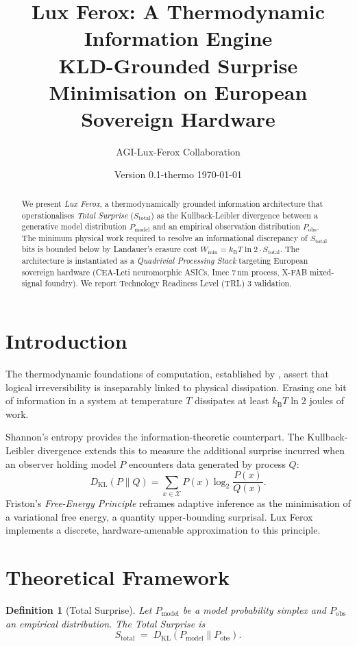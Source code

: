 \documentclass[11pt,a4paper,twocolumn]{article}
\title{%
  \textbf{Lux Ferox: A Thermodynamic Information Engine}\\[4pt]
  \large KLD-Grounded Surprise Minimisation on European Sovereign Hardware
}
\author{AGI-Lux-Ferox Collaboration}
\date{Version 0.1-thermo \quad \today}
\newtheorem{definition}{Definition}
\newcommand{\DKL}{D_{\mathrm{KL}}}
\newcommand{\kB}{k_{\mathrm{B}}}
\newcommand{\Stot}{S_{\mathrm{total}}}
\newcommand{\Wmin}{W_{\min}}
\begin{document}
\maketitle

\begin{abstract}
We present \textit{Lux Ferox}, a thermodynamically grounded information
architecture that operationalises \emph{Total Surprise} ($\Stot$) as the
Kullback-Leibler divergence between a generative model distribution
$P_{\text{model}}$ and an empirical observation distribution
$P_{\text{obs}}$.
The minimum physical work required to resolve an informational discrepancy
of $\Stot$ bits is bounded below by Landauer's erasure cost
$\Wmin = \kB T \ln 2 \cdot \Stot$.
The architecture is instantiated as a \emph{Quadrivial Processing Stack}
targeting European sovereign hardware (CEA-Leti neuromorphic ASICs,
Imec 7\,nm process, X-FAB mixed-signal foundry).
We report Technology Readiness Level (TRL) 3 validation.
\end{abstract}

\section{Introduction}
The thermodynamic foundations of computation, established by
\citet{landauer1961}, assert that logical irreversibility is inseparably
linked to physical dissipation. Erasing one bit of information in a system
at temperature $T$ dissipates at least $\kB T \ln 2$ joules of work.

Shannon's entropy \citep{shannon1948} provides the information-theoretic
counterpart. The Kullback-Leibler divergence \citep{kullback1951} extends
this to measure the additional surprise incurred when an observer holding
model $P$ encounters data generated by process $Q$:
\begin{equation}
  \DKL(P \| Q) = \sum_{x \in \mathcal{X}} P(x) \log_2 \frac{P(x)}{Q(x)}.
  \label{eq:kld}
\end{equation}
Friston's \emph{Free-Energy Principle} \citep{friston2010} reframes
adaptive inference as the minimisation of a variational free energy, a
quantity upper-bounding surprisal. Lux Ferox implements a discrete,
hardware-amenable approximation to this principle.

\section{Theoretical Framework}
\begin{definition}[Total Surprise]
Let $P_{\text{model}}$ be a model probability simplex and $P_{\text{obs}}$
an empirical distribution. The \emph{Total Surprise} is
\begin{equation}
  \Stot \;=\; \DKL(P_{\text{model}} \| P_{\text{obs}}).
  \label{eq:stot}
\end{equation}
\end{definition}
\end{document}
